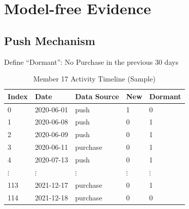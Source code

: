 \documentclass[aspectratio=169]{beamer}  %
\begin{document}
\section{Model-free Evidence}
\subsection{Push Mechanism}

\begin{frame}{Define ``Dormant'': No Purchase in the previous 30 days}
\begin{table}[h]
\centering
\caption{Member 17 Activity Timeline (Sample)}
\label{tab:member17_timeline}
\begin{tabular}{lllll}
\toprule
\textbf{Index} & \textbf{Date} & \textbf{Data Source} & \textbf{New} & \textbf{Dormant} \\
\midrule
0 & 2020-06-01 & push & 1 & 0 \\
1 & 2020-06-08 & push & 0 & 1 \\
2 & 2020-06-09 & push & 0 & 1 \\
3 & 2020-06-11 & purchase & 0 & 1 \\
4 & 2020-07-13 & push & 0 & 1 \\
$\vdots$ & $\vdots$ & $\vdots$ & $\vdots$ & $\vdots$ \\
113 & 2021-12-17 & purchase & 0 & 1 \\
114 & 2021-12-18 & purchase & 0 & 0 \\
\bottomrule
\end{tabular}
\end{table}
\end{frame}
\end{document}
